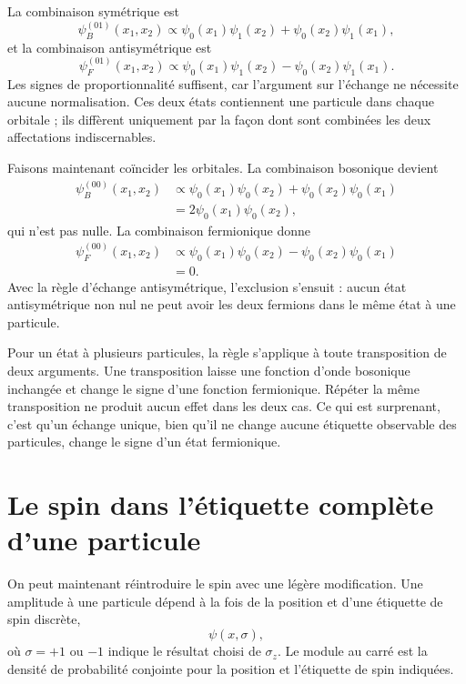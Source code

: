 La combinaison symétrique est
\begin{equation}
\psi_B^{(01)}(x_1,x_2)
\propto
\psi_0(x_1)\psi_1(x_2)
+
\psi_0(x_2)\psi_1(x_1),
\end{equation}
et la combinaison antisymétrique est
\begin{equation}
\psi_F^{(01)}(x_1,x_2)
\propto
\psi_0(x_1)\psi_1(x_2)
-
\psi_0(x_2)\psi_1(x_1).
\end{equation}
Les signes de proportionnalité suffisent, car l’argument sur l’échange ne nécessite aucune normalisation. Ces deux états contiennent une particule dans chaque orbitale ; ils diffèrent uniquement par la façon dont sont combinées les deux affectations indiscernables.

Faisons maintenant coïncider les orbitales. La combinaison bosonique devient
\begin{align}
\psi_B^{(00)}(x_1,x_2)
&\propto
\psi_0(x_1)\psi_0(x_2)
+
\psi_0(x_2)\psi_0(x_1)\\
&=
2\psi_0(x_1)\psi_0(x_2),
\end{align}
qui n’est pas nulle. La combinaison fermionique donne
\begin{align}
\psi_F^{(00)}(x_1,x_2)
&\propto
\psi_0(x_1)\psi_0(x_2)
-
\psi_0(x_2)\psi_0(x_1)\\
&=0.
\end{align}
Avec la règle d’échange antisymétrique, l’exclusion s’ensuit : aucun état antisymétrique non nul ne peut avoir les deux fermions dans le même état à une particule.

Pour un état à plusieurs particules, la règle s’applique à toute transposition de deux arguments. Une transposition laisse une fonction d’onde bosonique inchangée et change le signe d’une fonction fermionique. Répéter la même transposition ne produit aucun effet dans les deux cas. Ce qui est surprenant, c’est qu’un échange unique, bien qu’il ne change aucune étiquette observable des particules, change le signe d’un état fermionique.

\section{Le spin dans l’étiquette complète d’une particule}

On peut maintenant réintroduire le spin avec une légère modification. Une amplitude à une particule dépend à la fois de la position et d’une étiquette de spin discrète,
\begin{equation}
\psi(x,\sigma),
\end{equation}
où \(\sigma=+1\) ou \(-1\) indique le résultat choisi de \(\sigma_z\). Le module au carré est la densité de probabilité conjointe pour la position et l’étiquette de spin indiquées.

